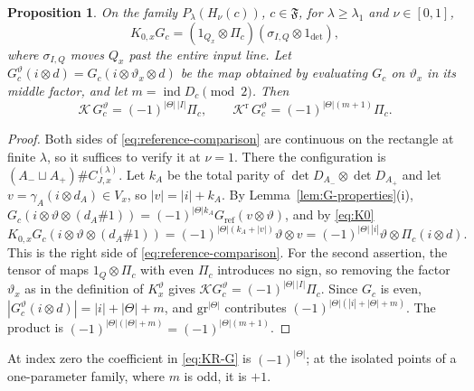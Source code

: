 \documentclass[11pt]{amsart}
\newtheorem{proposition}[theorem]{Proposition}
\theoremstyle{definition}
\theoremstyle{remark}
\theoremstyle{plain}
\numberwithin{equation}{section}
\newcommand{\eps}{\mathrm{gr}}
\newcommand{\ind}{\operatorname{ind}}
\begin{document}
\begin{proposition}\label{prop:reference-comparison}
On the family $P_\lambda(H_\nu(c))$, $c\in\mathfrak F$, for $\lambda\ge\lambda_1$
and $\nu\in[0,1]$,
\begin{equation}\label{eq:reference-comparison}
 K_{0,x}G_c=(1_{Q_x}\otimes \Pi_c)(\sigma_{I,Q}\otimes1_{\det}),
\end{equation}
where $\sigma_{I,Q}$ moves $Q_x$ past the entire input line. Let
$G^{\vartheta}_c(i\otimes d)=G_c(i\otimes \vartheta_x\otimes d)$ be the map obtained
by evaluating $G_c$ on $\vartheta_x$ in its middle factor, and let
$m=\ind D_c\pmod2$. Then
\begin{equation}\label{eq:KR-G}
 \mathcal K\,G^{\vartheta}_c=(-1)^{|\Theta|\,|I|}\Pi_c,\qquad
 \mathcal K^{\mathrm r}\,G^{\vartheta}_c=(-1)^{|\Theta|(m+1)}\Pi_c .
\end{equation}
\end{proposition}
\begin{proof}
Both sides of \eqref{eq:reference-comparison} are continuous on the
rectangle at finite $\lambda$, so it suffices to verify it at $\nu=1$.
There the configuration is $(A_-\sqcup A_+)\#C^{(\lambda)}_{J,x}$.
Let $k_A$ be the total parity of $\det D_{A_-}\otimes\det D_{A_+}$ and
let $v=\gamma_A(i\otimes d_A)\in V_x$, so $|v|=|i|+k_A$. By
Lemma~\ref{lem:G-properties}(i),
$G_c(i\otimes \vartheta\otimes(d_A\#1))
=(-1)^{|\Theta|k_A}G_{\mathrm{ref}}(v\otimes \vartheta)$, and by \eqref{eq:K0}
\[
 K_{0,x}G_c(i\otimes \vartheta\otimes(d_A\#1))
 =(-1)^{|\Theta|(k_A+|v|)}\vartheta\otimes v=(-1)^{|\Theta|\,|i|}\vartheta\otimes \Pi_c(i\otimes d).
\]
This is the right side of \eqref{eq:reference-comparison}. For the
second assertion, the tensor of maps $1_Q\otimes \Pi_c$ with even $\Pi_c$
introduces no sign, so removing the factor $\vartheta_x$ as in the definition of
$K^\vartheta_x$ gives $\mathcal KG^{\vartheta}_c=(-1)^{|\Theta|\,|I|}\Pi_c$. Since $G_c$ is
even, $|G^{\vartheta}_c(i\otimes d)|=|i|+|\Theta|+m$, and $\eps^{|\Theta|}$ contributes
$(-1)^{|\Theta|(|i|+|\Theta|+m)}$. The product is $(-1)^{|\Theta|(|\Theta|+m)}=(-1)^{|\Theta|(m+1)}$.
\end{proof}

At index zero the coefficient in \eqref{eq:KR-G} is $(-1)^{|\Theta|}$; at the
isolated points of a one-parameter family, where $m$ is odd, it is
$+1$.
\end{document}
